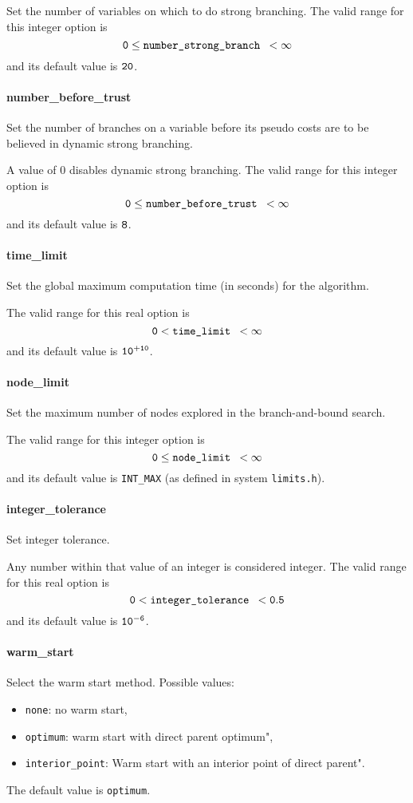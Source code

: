  Set the number of variables on which to do strong
branching. The valid range for this integer option is
$${\tt 0} \le \hbox{\tt number\_strong\_branch } <  \infty$$
and its default value is ${\tt 20}$.


\paragraph{number\_before\_trust}
\label{number_before_trust}
Set the number of branches on a variable before its pseudo costs are to
be believed in dynamic strong branching.

 A value of 0 disables dynamic strong branching. The valid range for this integer option is
$${\tt 0} \le \hbox{\tt number\_before\_trust } <  \infty$$
and its default value is ${\tt 8}$.


\paragraph{time\_limit}
\label{time_limit}
Set the global maximum computation time (in seconds) for the algorithm.

 The valid range for this real option is
$${\tt 0} <  \hbox{\tt time\_limit } <  \infty$$
and its default value is ${\tt 10^{+10}}$.


\paragraph{node\_limit}
\label{node_limit}
Set the maximum number of nodes explored in the branch-and-bound search.

The valid range for this integer option is
$${\tt 0} \le \hbox{\tt node\_limit } <  \infty$$
and its default value is {\tt INT\_MAX} (as defined in system {\tt limits.h}).


\paragraph{integer\_tolerance}
\label{integer_tolerance}
Set integer tolerance.

 Any number within that value of an integer is
considered integer.
The valid range for this real option is
$${\tt 0} <  \hbox{\tt integer\_tolerance } <  {\tt 0.5}$$
and its default value is ${\tt 10^{-6}}$.


\paragraph{warm\_start}
\label{warm_start}
Select the warm start method. Possible values:
\begin{itemize}
 \item {\tt none}: no warm start,
\item {\tt optimum}: warm start with direct parent optimum",
\item {\tt interior\_point}: Warm start with an interior point of direct parent".
\end{itemize}
The default value is {\tt optimum}.

